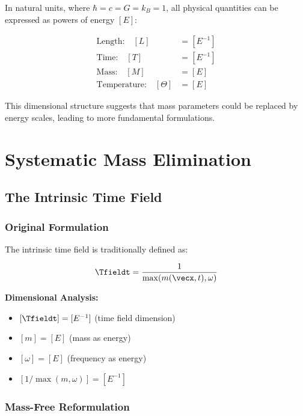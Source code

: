 	In natural units, where $\hbar = c = G = k_B = 1$, all physical quantities can be expressed as powers of energy $[E]$:
	
	\begin{align}
		\text{Length:} \quad [L] &= [E^{-1}] \\
		\text{Time:} \quad [T] &= [E^{-1}] \\
		\text{Mass:} \quad [M] &= [E] \\
		\text{Temperature:} \quad [\Theta] &= [E]
	\end{align}
	
	This dimensional structure suggests that mass parameters could be replaced by energy scales, leading to more fundamental formulations.
	
	\section{Systematic Mass Elimination}
	\label{sec:mass_elimination}
	
	\subsection{The Intrinsic Time Field}
	\label{subsec:time_field_elimination}
	
	\subsubsection{Original Formulation}
	
	The intrinsic time field is traditionally defined as:
	
	\begin{equation}
		\Tfieldt = \frac{1}{\max(m(\vecx,t), \omega)}
		\label{eq:time_field_original}
	\end{equation}
	
	\textbf{Dimensional Analysis:}
	\begin{itemize}
		\item $[\Tfieldt] = [E^{-1}]$ (time field dimension)
		\item $[m] = [E]$ (mass as energy)
		\item $[\omega] = [E]$ (frequency as energy)
		\item $[1/\max(m,\omega)] = [E^{-1}]$ \checkmark
	\end{itemize}
	
	\subsubsection{Mass-Free Reformulation}
	
